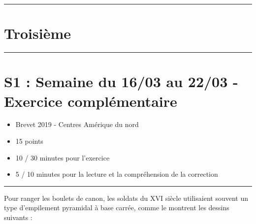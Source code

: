 \documentclass[11pt]{article}
\newcommand{\horrule}[1]{\rule{\linewidth}{#1}} %
\begin{document}

\newtheorem{Definition}{Définition}
\newtheorem{Theorem}{Théorème}
\newtheorem{Proposition}{Propriété}

\renewcommand{\labelitemi}{$\bullet$}
\renewcommand{\labelitemii}{$\circ$}

\setlength{\columnseprule}{1pt}

\horrule{2px}
\section*{Troisième}
\horrule{2px}

\section*{S1 : Semaine du 16/03 au 22/03 - Exercice complémentaire}

\begin{itemize}
  \item Brevet 2019 - Centres Amérique du nord
  \item 15 points
  \item 10 / 30 minutes pour l'exercice
  \item 5 / 10 minutes pour la lecture et la compréhension de la correction
\end{itemize}

 \horrule{2px}


Pour ranger les boulets de canon, les soldats du XVI siècle utilisaient souvent un type d'empilement pyramidal à base carrée, comme le montrent les dessins suivants :
\end{document}
